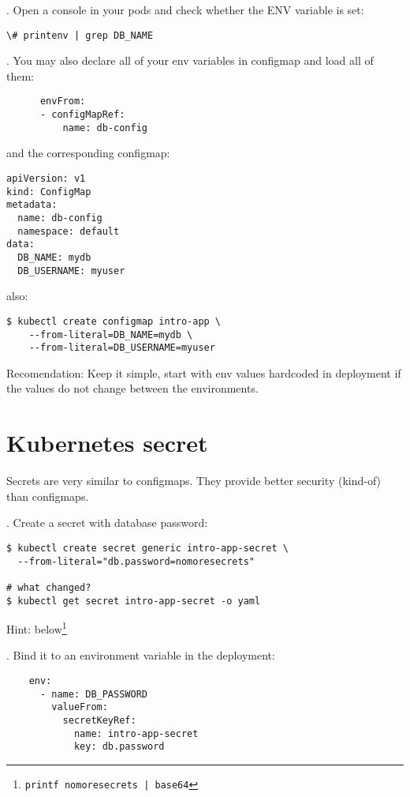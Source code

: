 \documentclass[12pt, letterpaper]{article}
\begin{document}
. Open a console in your pods and check whether the ENV variable is set:

\begin{verbatim}
\# printenv | grep DB_NAME
\end{verbatim}

. You may also declare all of your env variables in configmap and load all of them:

\begin{verbatim}
      envFrom:
      - configMapRef:
          name: db-config
\end{verbatim}

and the corresponding configmap:

\begin{verbatim}
apiVersion: v1
kind: ConfigMap
metadata:
  name: db-config
  namespace: default
data:
  DB_NAME: mydb
  DB_USERNAME: myuser
\end{verbatim}

also:

\begin{verbatim}
$ kubectl create configmap intro-app \
    --from-literal=DB_NAME=mydb \
    --from-literal=DB_USERNAME=myuser
\end{verbatim}

\bigskip
Recomendation: Keep it simple, start with env values hardcoded in deployment if the values do not change between the environments.

\section{Kubernetes secret}

Secrets are very similar to configmaps. They provide better security (kind-of) than configmaps.

. Create a secret with database password:

\begin{verbatim}
$ kubectl create secret generic intro-app-secret \
  --from-literal="db.password=nomoresecrets"

# what changed?
$ kubectl get secret intro-app-secret -o yaml
\end{verbatim}

Hint: below\footnote{\texttt{printf nomoresecrets | base64}}

\bigskip
2. Bind it to an environment variable in the deployment:

\begin{verbatim}
    env:
      - name: DB_PASSWORD
        valueFrom:
          secretKeyRef:
            name: intro-app-secret
            key: db.password

\end{verbatim}
\end{document}
